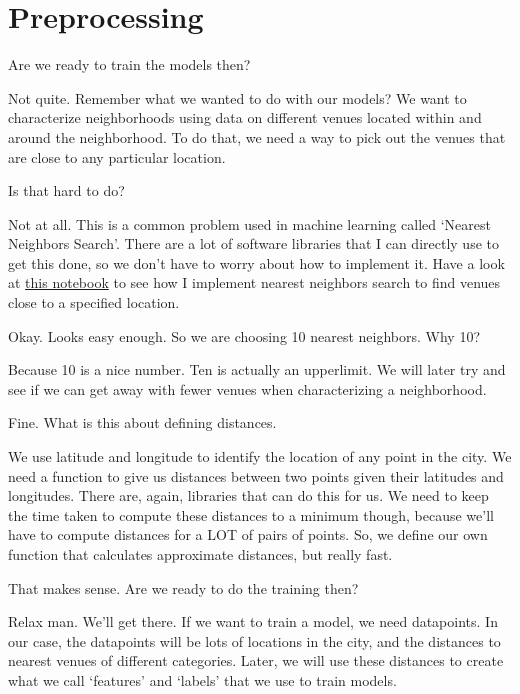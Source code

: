 \chapter{Preprocessing}\label{chap:preprocessing}

{\color{blue} Are we ready to train the models then? }

Not quite. Remember what we wanted to do with our models? We want to characterize neighborhoods using data on different venues located within and around the neighborhood. To do that, we need a way to pick out the venues that are close to any particular location. 

{\color{blue} Is that hard to do?}

Not at all. This is a common problem used in machine learning called `Nearest Neighbors Search'. There are a lot of software libraries that I can directly use to get this done, so we don't have to worry about how to implement it. Have a look at \href{https://github.com/saba-vadarevu/IBM-dataScience-Capstone/blob/master/final/preprocessing.ipynb}{this notebook} to see how I implement nearest neighbors search to find venues close to a specified location. 

{\color{blue} Okay. Looks easy enough. So we are choosing 10 nearest neighbors. Why 10?}

Because 10 is a nice number. Ten is actually an upperlimit. We will later try and see if we can get away with fewer venues when characterizing a neighborhood.

{\color{blue} Fine. What is this about defining distances.}

We use latitude and longitude to identify the location of any point in the city. We need a function to give us distances between two points given their latitudes and longitudes. There are, again, libraries that can do this for us. We need to keep the time taken to compute these distances to a minimum though, because we'll have to compute distances for a LOT of pairs of points. So, we define our own function that calculates approximate distances, but really fast. 

{\color{blue} That makes sense. Are we ready to do the training then? }

Relax man. We'll get there. If we want to train a model, we need datapoints. In our case, the datapoints will be lots of locations in the city, and the distances to nearest venues of different categories. Later, we will use these distances to create what we call `features' and `labels' that we use to train models. 

